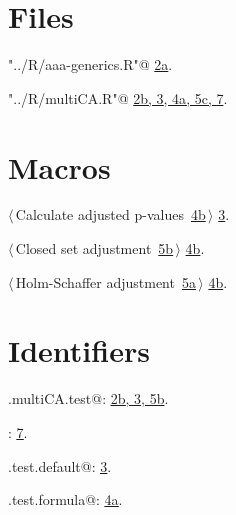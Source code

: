 \documentclass[reqno]{amsart}
\renewcommand{\NWlink}[2]{\hyperlink{#1}{#2}}
\begin{document}
\section{Files}


{\small\begin{list}{}{\setlength{\itemsep}{-\parsep}\setlength{\itemindent}{-\leftmargin}}
\item \verb@"../R/aaa-generics.R"@ {\footnotesize {\NWtxtDefBy} \NWlink{nuweb2a}{2a}.}
\item \verb@"../R/multiCA.R"@ {\footnotesize {\NWtxtDefBy} \NWlink{nuweb2b}{2b}\NWlink{nuweb3}{, 3}\NWlink{nuweb4a}{, 4a}\NWlink{nuweb5c}{, 5c}\NWlink{nuweb7}{, 7}.
}
\end{list}}

\section{Macros}


{\small\begin{list}{}{\setlength{\itemsep}{-\parsep}\setlength{\itemindent}{-\leftmargin}}
\item $\langle\,$Calculate adjusted p-values\nobreak\ {\footnotesize \NWlink{nuweb4b}{4b}}$\,\rangle$ {\footnotesize {\NWtxtRefIn} \NWlink{nuweb3}{3}.}
\item $\langle\,$Closed set adjustment\nobreak\ {\footnotesize \NWlink{nuweb5b}{5b}}$\,\rangle$ {\footnotesize {\NWtxtRefIn} \NWlink{nuweb4b}{4b}.}
\item $\langle\,$Holm-Schaffer adjustment\nobreak\ {\footnotesize \NWlink{nuweb5a}{5a}}$\,\rangle$ {\footnotesize {\NWtxtRefIn} \NWlink{nuweb4b}{4b}.}
\end{list}}

\section{Identifiers}


{\small\begin{list}{}{\setlength{\itemsep}{-\parsep}\setlength{\itemindent}{-\leftmargin}}
\item \verb@.multiCA.test@: \underline{\NWlink{nuweb2b}{2b}}\NWlink{nuweb3}{, 3}\NWlink{nuweb5b}{, 5b}.
\item \verb@cnonct@: \underline{\NWlink{nuweb7}{7}}.
\item \verb@multiCA.test.default@: \underline{\NWlink{nuweb3}{3}}.
\item \verb@multiCA.test.formula@: \underline{\NWlink{nuweb4a}{4a}}.
\end{list}}
\end{document}
